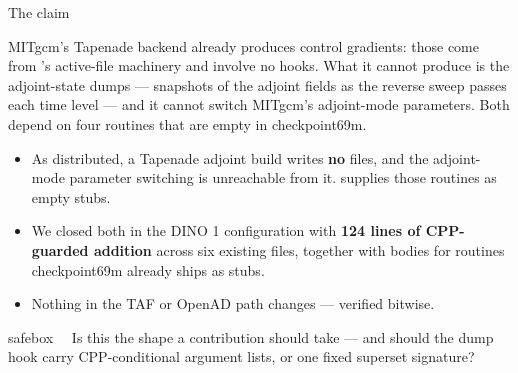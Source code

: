 %

\begin{frame}{The claim}

MITgcm's Tapenade backend already produces  control gradients:
those come from 's active-file machinery and involve no hooks.
What it cannot produce is the  adjoint-state dumps --- snapshots of
the adjoint fields as the reverse sweep passes each time level --- and it
cannot switch MITgcm's adjoint-mode parameters. Both depend on four routines
that are empty in checkpoint69m.

\medskip
\begin{itemize}
  \item As distributed, a Tapenade adjoint build writes \textbf{no}
         files, and the adjoint-mode parameter switching is
        unreachable from it.  supplies those
        routines as empty stubs.
  \item We closed both in the DINO 1\textdegree{} configuration with
        \textbf{124 lines of CPP-guarded addition} across six existing files,
        together with bodies for routines checkpoint69m already ships as
        stubs.
  \item Nothing in the TAF or OpenAD path changes --- verified bitwise.
\end{itemize}

\vfill
\begin{beamercolorbox}[wd=\textwidth,sep=5pt]{safebox}
  \ \ 
  Is this the shape a contribution should take --- and should the dump hook
  carry CPP-conditional argument lists, or one fixed superset signature?
\end{beamercolorbox}
\end{frame}


